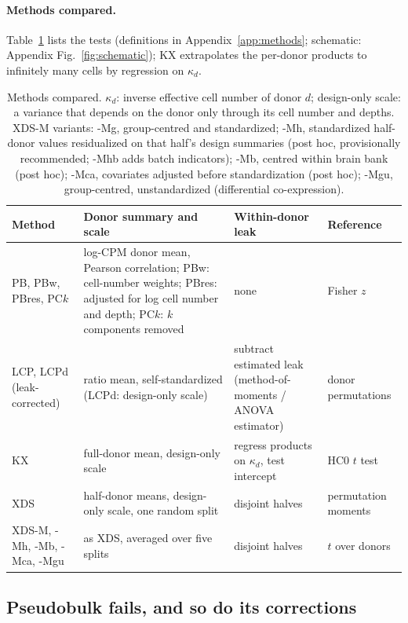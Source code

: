 \paragraph{Methods compared.} Table~\ref{tab:methods} lists the tests (definitions in Appendix~\ref{app:methods}; schematic: Appendix Fig.~\ref{fig:schematic}); KX extrapolates the per-donor products to infinitely many cells by regression on $\kappa_d$.

\begin{table}[!t]\centering\setlength{\tabcolsep}{3pt}
\caption{Methods compared. $\kappa_d$: inverse effective cell number of donor $d$; design-only scale: a variance that depends on the donor only through its cell number and depths. XDS-M variants: -Mg, group-centred and standardized; -Mh, standardized half-donor values residualized on that half's design summaries (post hoc, provisionally recommended; -Mhb adds batch indicators); -Mb, centred within brain bank (post hoc); -Mca, covariates adjusted before standardization (post hoc); -Mgu, group-centred, unstandardized (differential co-expression).}\label{tab:methods}
\begin{tabular}{@{}>{\raggedright\arraybackslash}p{1.1in}>{\raggedright\arraybackslash}p{2.25in}>{\raggedright\arraybackslash}p{1.7in}>{\raggedright\arraybackslash}p{1.1in}@{}}\toprule
Method & Donor summary and scale & Within-donor leak & Reference\\\midrule
PB, PBw, PBres, PC$k$ & log-CPM donor mean, Pearson correlation; PBw: cell-number weights; PBres: adjusted for log cell number and depth; PC$k$: $k$ components removed & none & Fisher $z$\\
LCP, LCPd (leak-corrected) & ratio mean, self-standardized (LCPd: design-only scale) & subtract estimated leak (method-of-moments / ANOVA estimator) & donor permutations\\
KX & full-donor mean, design-only scale & regress products on $\kappa_d$, test intercept & HC0 $t$ test\\
XDS & half-donor means, design-only scale, one random split & disjoint halves & permutation moments\\
XDS-M, -Mh, -Mb, -Mca, -Mgu & as XDS, averaged over five splits & disjoint halves & $t$ over donors\\
\bottomrule\end{tabular}\end{table}

\subsection{Pseudobulk fails, and so do its corrections}\label{sec:null}

